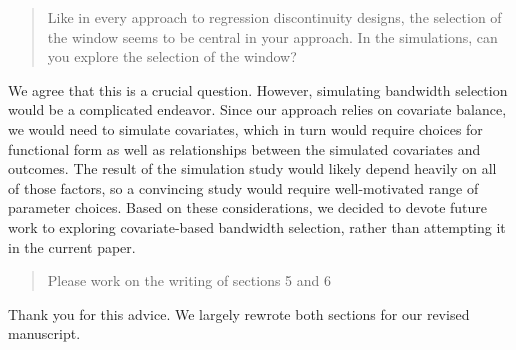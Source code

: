 \documentclass[12pt]{article}
\begin{document}
\begin{quote}
Like in every approach to regression discontinuity designs, the
selection of the window seems to be central in your approach. In the
simulations, can you explore the selection of the window?
\end{quote}
We agree that this is a crucial question. However, simulating bandwidth
selection would be a complicated endeavor. Since our approach relies on
covariate balance, we would need to simulate covariates, which in turn
would require choices for functional form as well as relationships
between the simulated covariates and outcomes. The result of the
simulation study would likely depend heavily on all of those factors, so a
convincing study would require well-motivated range of parameter
choices. Based on these considerations, we decided to devote future
work to exploring covariate-based bandwidth selection, rather than
attempting it in the current paper.

\begin{quote}
Please work on the writing of sections 5 and 6
\end{quote}
Thank you for this advice. We largely rewrote both sections for our
revised manuscript.
\end{document}
